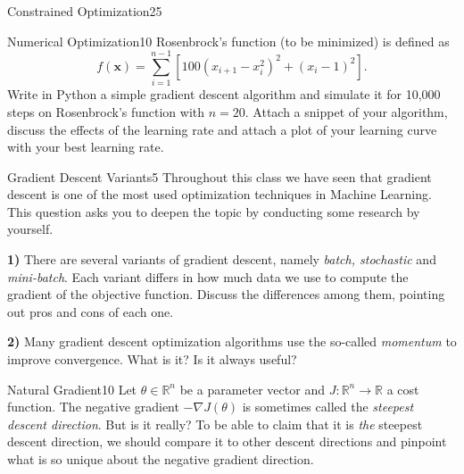\begin{questions}
\begin{question}{Constrained Optimization}{25}
\begin{answer}\end{answer}

\end{question}
	


\begin{question}{Numerical Optimization}{10}
Rosenbrock's function (to be minimized) is defined as 
$$f(\boldsymbol{x}) = \sum_{i=1}^{n-1} \left[ 100 (x_{i+1} - x_{i}^{2})^{2} + (x_{i} - 1)^{2}\right].$$
Write in Python a simple gradient descent algorithm and simulate it for 10,000 steps on Rosenbrock's function with $n=20$. Attach a snippet of your algorithm, discuss the effects of the learning rate and attach a plot of your learning curve with your best learning rate.

\begin{answer}\end{answer}

\end{question}


\begin{question}{Gradient Descent Variants}{5}
Throughout this class we have seen that gradient descent is one of the most used optimization techniques in Machine Learning. This question asks you to deepen the topic by conducting some research by yourself.

\textbf{1)} There are several variants of gradient descent, namely \emph{batch, stochastic} and \emph{mini-batch}. Each variant differs in how much data we use to compute the gradient of the objective function. 
Discuss the differences among them, pointing out pros and cons of each one.

\textbf{2)} Many gradient descent optimization algorithms use the so-called \emph{momentum} to improve convergence. What is it? Is it always useful?

\begin{answer}\end{answer}

\end{question}

\begin{question}[bonus]{Natural Gradient}{10}
Let $\theta \in \mathbb{R}^n$ be a parameter vector
and $J \colon \mathbb{R}^n \to \mathbb{R}$ a cost function.
The negative gradient $-\nabla J(\theta)$ is sometimes called
the \emph{steepest descent direction}. But is it really?
To be able to claim that it is \emph{the} steepest descent direction,
we should compare it to other descent directions
and pinpoint what is so unique about the negative gradient direction.


\end{question}
\end{questions}

